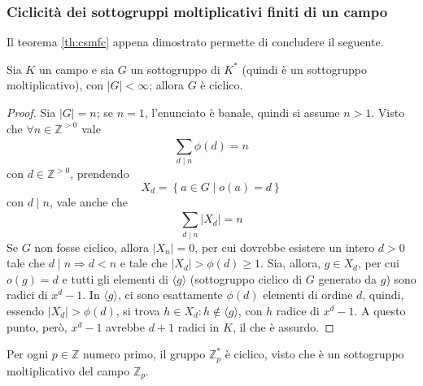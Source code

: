 \documentclass[11pt, a4paper]{scrartcl}
\theoremstyle{definition}
\numberwithin{esempio}{section}
\theoremstyle{definition}
\numberwithin{obs}{section}
\numberwithin{nota}{section}
\numberwithin{equation}{subsection}
\begin{document}
\subsubsection{Ciclicit\`a dei sottogruppi moltiplicativi finiti di un campo}
Il teorema \ref{th:csmfc} appena dimostrato permette di concludere il seguente.
\begin{teorema}
	{}{}
	Sia $K$ un campo e sia $G$ un sottogruppo di $K^*$ (quindi \`e un sottogruppo moltiplicativo), con $|G|<\infty$; allora $G$ \`e ciclico.
	\begin{proof}
		Sia $|G| = n$; se $n=1$, l'enunciato \`e banale, quindi si assume $n>1$.
		Visto che $\forall n \in \mathbb{Z}^{>0} $ vale 
		\[
		\sum_{d \mid n}^{} \phi (d) = n
		\] 
		con $d \in \mathbb{Z}^{>0} $, prendendo 
		\[
		X_d = \left\{ a \in G  \mid o(a) = d \right\} 
		\] 
	con $d  \mid n$, vale anche che
	\[
	\sum_{d \mid n}^{}  \lvert X_d \rvert =n
	\] 
	Se $G $ non fosse ciclico, allora $\lvert X_n \rvert =0$, per cui dovrebbe esistere un intero $d>0$ tale che $d  \mid n \Rightarrow  d < n$ e tale che $\lvert X_d \rvert > \phi (d) \ge 1$.
	Sia, allora, $g \in X_d$, per cui $o(g) = d$ e tutti gli elementi di $\langle g \rangle$ (sottogruppo ciclico di $G$ generato da $g$) sono radici di $x^d - 1$.
	In $\langle g \rangle$, ci sono esattamente $\phi (d)$ elementi di ordine $d$, quindi, essendo $\lvert X_d \rvert > \phi (d)$, si trova $h \in X_d : h \not \in \langle g \rangle$, con $h$ radice di $x^d - 1$. 
	A questo punto, per\`o, $x^d - 1$ avrebbe $d+1$ radici in $K$, il che \`e assurdo.
	\end{proof}
\end{teorema}
\begin{corollario}
	{}{}
	Per ogni $p \in \mathbb{Z}$ numero primo, il gruppo $\mathbb{Z}^*_p$ \`e ciclico, visto che \`e un sottogruppo moltiplicativo del campo $\mathbb{Z}_p$.
\end{corollario}
\end{document}
